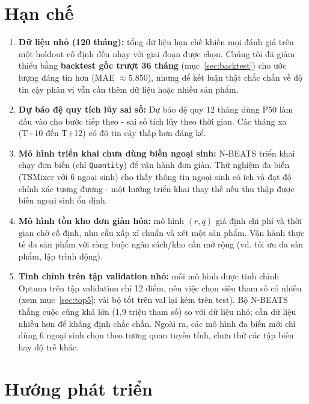 \documentclass[12pt, a4paper]{report}
\begin{document}
\section{Hạn chế}

\begin{enumerate}
  \item \textbf{Dữ liệu nhỏ (120 tháng):} tổng dữ liệu hạn chế khiến mọi đánh giá trên một holdout cố định đều nhạy với giai đoạn được chọn. Chúng tôi đã giảm thiểu bằng \textbf{backtest gốc trượt 36 tháng} (mục~\ref{sec:backtest}) cho ước lượng đáng tin hơn (MAE $\approx 5.850$), nhưng để kết luận thật chắc chắn về độ tin cậy phân vị vẫn cần thêm dữ liệu hoặc nhiều sản phẩm.

  \item \textbf{Dự báo đệ quy tích lũy sai số:} Dự báo đệ quy 12 tháng dùng P50 làm đầu vào cho bước tiếp theo - sai số tích lũy theo thời gian. Các tháng xa (T+10 đến T+12) có độ tin cậy thấp hơn đáng kể.

  \item \textbf{Mô hình triển khai chưa dùng biến ngoại sinh:} N-BEATS triển khai chạy đơn biến (chỉ \texttt{Quantity}) để vận hành đơn giản. Thử nghiệm đa biến (TSMixer với 6 ngoại sinh) cho thấy thông tin ngoại sinh có ích và đạt độ chính xác tương đương - một hướng triển khai thay thế nếu thu thập được biến ngoại sinh ổn định.

  \item \textbf{Mô hình tồn kho đơn giản hóa:} mô hình $(r,q)$ giả định chi phí và thời gian chờ cố định, nhu cầu xấp xỉ chuẩn và xét một sản phẩm. Vận hành thực tế đa sản phẩm với ràng buộc ngân sách/kho cần mở rộng (vd. tối ưu đa sản phẩm, lập trình động).

  \item \textbf{Tinh chỉnh trên tập validation nhỏ:} mỗi mô hình được tinh chỉnh Optuna trên tập validation chỉ 12 điểm, nên việc chọn siêu tham số có nhiễu (xem mục~\ref{sec:top5}: vài bộ tốt trên val lại kém trên test). Bộ N-BEATS thắng cuộc cũng khá lớn (1,9 triệu tham số) so với dữ liệu nhỏ; cần dữ liệu nhiều hơn để khẳng định chắc chắn. Ngoài ra, các mô hình đa biến mới chỉ dùng 6 ngoại sinh chọn theo tương quan tuyến tính, chưa thử các tập biến hay độ trễ khác.
\end{enumerate}

\section{Hướng phát triển}
\label{sec:future}
\end{document}
